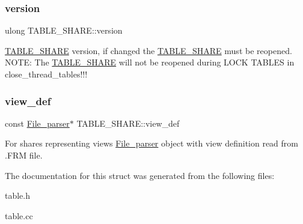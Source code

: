 \subsubsection{\texorpdfstring{version}{version}}
{\footnotesize\ttfamily ulong T\+A\+B\+L\+E\+\_\+\+S\+H\+A\+R\+E\+::version}

\mbox{\hyperlink{structTABLE__SHARE}{T\+A\+B\+L\+E\+\_\+\+S\+H\+A\+RE}} version, if changed the \mbox{\hyperlink{structTABLE__SHARE}{T\+A\+B\+L\+E\+\_\+\+S\+H\+A\+RE}} must be reopened. N\+O\+TE\+: The \mbox{\hyperlink{structTABLE__SHARE}{T\+A\+B\+L\+E\+\_\+\+S\+H\+A\+RE}} will not be reopened during L\+O\+CK T\+A\+B\+L\+ES in close\+\_\+thread\+\_\+tables!!! \mbox{\label{structTABLE__SHARE_a6d49595d1beeea24f9e653efaa0d41a2}} 
\subsubsection{\texorpdfstring{view\+\_\+def}{view\_def}}
{\footnotesize\ttfamily const \mbox{\hyperlink{classFile__parser}{File\+\_\+parser}}$\ast$ T\+A\+B\+L\+E\+\_\+\+S\+H\+A\+R\+E\+::view\+\_\+def}

For shares representing views \mbox{\hyperlink{classFile__parser}{File\+\_\+parser}} object with view definition read from .F\+RM file. 

The documentation for this struct was generated from the following files\+:\begin{DoxyCompactItemize}
\item 
table.\+h\item 
table.\+cc\end{DoxyCompactItemize}
